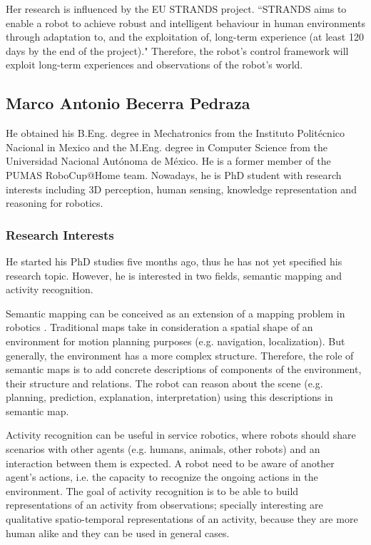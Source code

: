 \documentclass[conference]{IEEEtran}
\begin{document}
Her research is influenced by the EU STRANDS project. ``STRANDS aims to enable a robot to achieve robust and intelligent behaviour in human environments through adaptation to, and the exploitation of, long-term experience (at least 120 days by the end of the project)." \cite{strands}
Therefore, the robot's control framework will exploit long-term experiences and observations of the robot's world. 

\subsection{Marco Antonio Becerra Pedraza}

He obtained his B.Eng. degree in Mechatronics from the Instituto Politécnico Nacional in Mexico and the M.Eng. degree in Computer Science from the Universidad Nacional Autónoma de México. He is a former member of the PUMAS RoboCup@Home team. Nowadays, he is PhD student with research interests including 3D perception, human sensing, knowledge representation and reasoning for robotics.

\subsubsection*{Research Interests}

He started his PhD studies five months ago, thus he has not yet specified his research topic. However, he is interested in two fields, semantic mapping and activity recognition.

Semantic mapping can be conceived as an extension of a mapping problem in robotics \cite{Nuchter08_TowardsSemanticMaps}. Traditional maps take in consideration a spatial shape of an environment for motion planning purposes (e.g. navigation, localization). But generally, the environment has a more complex structure. Therefore, the role of semantic maps is to add concrete descriptions of components of the environment, their structure and relations. The robot can reason about the scene (e.g. planning, prediction, explanation, interpretation) using this descriptions in semantic map.

Activity recognition can be useful in service robotics, where robots should share scenarios with other agents (e.g. humans, animals, other robots) and an interaction between them is expected. A robot need to be aware of another agent's actions, i.e. the capacity to recognize the ongoing actions in the environment. 
The goal of activity recognition is to be able to build representations of an activity from observations; specially interesting are qualitative spatio-temporal representations of an activity, because they are more human alike and they can be used in general cases.
\end{document}
